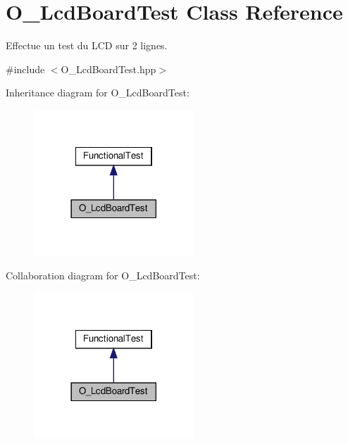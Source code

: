 \hypertarget{classO__LcdBoardTest}{}\section{O\+\_\+\+Lcd\+Board\+Test Class Reference}
\label{classO__LcdBoardTest}


Effectue un test du L\+CD sur 2 lignes.  




{\ttfamily \#include $<$O\+\_\+\+Lcd\+Board\+Test.\+hpp$>$}



Inheritance diagram for O\+\_\+\+Lcd\+Board\+Test\+:
\nopagebreak
\begin{figure}[H]
\begin{center}
\leavevmode
\includegraphics[width=170pt]{classO__LcdBoardTest__inherit__graph}
\end{center}
\end{figure}


Collaboration diagram for O\+\_\+\+Lcd\+Board\+Test\+:
\nopagebreak
\begin{figure}[H]
\begin{center}
\leavevmode
\includegraphics[width=170pt]{classO__LcdBoardTest__coll__graph}
\end{center}
\end{figure}
